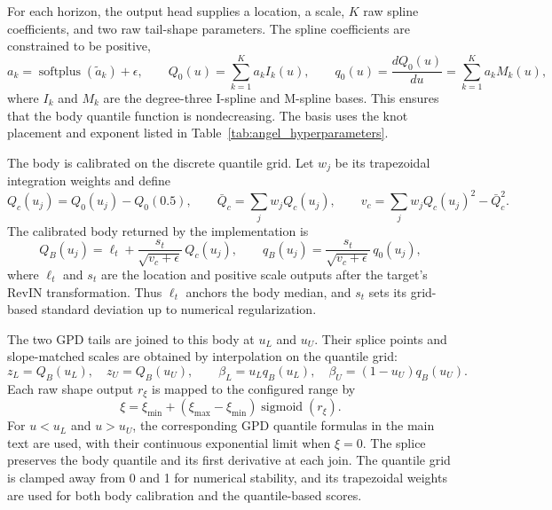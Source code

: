 \documentclass[a4paper,fleqn]{cas-sc}
\begin{document}
For each horizon, the output head supplies a location, a scale, $K$ raw
spline coefficients, and two raw tail-shape parameters. The spline
coefficients are constrained to be positive,
\begin{equation}
  a_k = \operatorname{softplus}(\tilde a_k)+\epsilon,
  \qquad
  Q_0(u)=\sum_{k=1}^{K}a_k I_k(u),
  \qquad
  q_0(u)=\frac{dQ_0(u)}{du}
        =\sum_{k=1}^{K}a_k M_k(u),
\end{equation}
where $I_k$ and $M_k$ are the degree-three I-spline and M-spline bases.
This ensures that the body quantile function is nondecreasing. The basis
uses the knot placement and exponent listed in
Table~\ref{tab:angel_hyperparameters}.

The body is calibrated on the discrete quantile grid. Let $w_j$ be its
trapezoidal integration weights and define
\begin{equation}
  Q_c(u_j)=Q_0(u_j)-Q_0(0.5),\qquad
  \bar Q_c=\sum_j w_j Q_c(u_j),\qquad
  v_c=\sum_j w_j Q_c(u_j)^2-\bar Q_c^2.
\end{equation}
The calibrated body returned by the implementation is
\begin{equation}
  Q_B(u_j)=\ell_t+
        \frac{s_t}{\sqrt{v_c+\epsilon}}\,Q_c(u_j),
  \qquad
  q_B(u_j)=
        \frac{s_t}{\sqrt{v_c+\epsilon}}\,q_0(u_j),
\end{equation}
where $\ell_t$ and $s_t$ are the location and positive scale outputs after
the target's RevIN transformation. Thus $\ell_t$ anchors the body median, and $s_t$ sets its grid-based standard deviation up to numerical regularization.

The two GPD tails are joined to this body at $u_L$ and $u_U$. Their splice points and slope-matched scales are obtained by interpolation on the
quantile grid:
\begin{equation}
 z_L=Q_B(u_L),\quad z_U=Q_B(u_U),\qquad
 \beta_L=u_Lq_B(u_L),\quad
 \beta_U=(1-u_U)q_B(u_U).
\end{equation}
Each raw shape output $r_\xi$ is mapped to the configured range by
\begin{equation}
  \xi=\xi_{\min}+(\xi_{\max}-\xi_{\min})\operatorname{sigmoid}(r_\xi).
\end{equation}
For $u<u_L$ and $u>u_U$, the corresponding GPD quantile formulas in the
main text are used, with their continuous exponential limit when $\xi=0$.
The splice preserves the body quantile and its first derivative at each
join. The quantile grid is clamped away from 0 and 1 for numerical
stability, and its trapezoidal weights are used for both body calibration
and the quantile-based scores.
\end{document}
